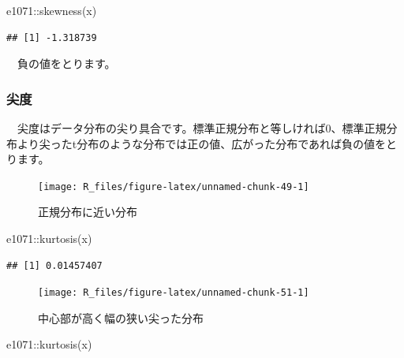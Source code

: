 \documentclass[
  12pt,
]{book}
\newenvironment{Shaded}{\begin{snugshade}}{\end{snugshade}}
\newcommand{\FunctionTok}[1]{\textcolor[rgb]{0.00,0.00,0.00}{#1}}
\newcommand{\NormalTok}[1]{#1}
\newcommand{\SpecialCharTok}[1]{\textcolor[rgb]{0.00,0.00,0.00}{#1}}
\begin{document}
\begin{Shaded}
\begin{Highlighting}[numbers=left,,]
\NormalTok{e1071}\SpecialCharTok{::}\FunctionTok{skewness}\NormalTok{(x)}
\end{Highlighting}
\end{Shaded}

\begin{verbatim}
## [1] -1.318739
\end{verbatim}

　負の値をとります。

\hypertarget{ux5c16ux5ea6}{%
\subsubsection*{\texorpdfstring{尖度}{尖度}}\label{ux5c16ux5ea6}}

　尖度はデータ分布の尖り具合です。標準正規分布と等しければ\(0\)、標準正規分布より尖ったt分布のような分布では正の値、広がった分布であれば負の値をとります。

\begin{figure}[H]

{\centering \texttt{[image: R\_files/figure-latex/unnamed-chunk-49-1]} 

}

\caption{正規分布に近い分布}\label{fig:unnamed-chunk-49}
\end{figure}

\begin{Shaded}
\begin{Highlighting}[numbers=left,,]
\NormalTok{e1071}\SpecialCharTok{::}\FunctionTok{kurtosis}\NormalTok{(x)}
\end{Highlighting}
\end{Shaded}

\begin{verbatim}
## [1] 0.01457407
\end{verbatim}

\begin{figure}[H]

{\centering \texttt{[image: R\_files/figure-latex/unnamed-chunk-51-1]} 

}

\caption{中心部が高く幅の狭い尖った分布}\label{fig:unnamed-chunk-51}
\end{figure}

\begin{Shaded}
\begin{Highlighting}[numbers=left,,]
\NormalTok{e1071}\SpecialCharTok{::}\FunctionTok{kurtosis}\NormalTok{(x)}
\end{Highlighting}
\end{Shaded}
\end{document}
